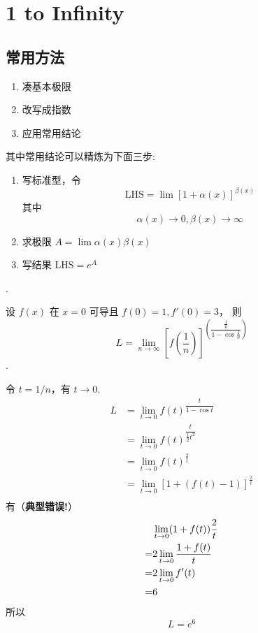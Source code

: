 \section{1 to Infinity}
\subsection{常用方法}
\begin{enumerate}
	\item 凑基本极限
	\item 改写成指数
	\item 应用常用结论
\end{enumerate}

其中常用结论可以精炼为下面三步:
\begin{enumerate}
	\item 写标准型，令
	\[\mbox{LHS} = \lim{} \left[ 1+\alpha(x)\right] ^{\beta(x)}\]
	其中 \[\alpha(x)\to0, \beta(x)\to\infty\]
	\item 求极限 $A = \lim \alpha(x)\beta(x)$
	\item 写结果 $\mbox{LHS} = e^{A}$
\end{enumerate}

\cite[question 30]{w660}.

\begin{example}
    \label{counter-example-of-usage-of-L-Hospital}
    设 $f(x)$ 在 $x = 0$ 可导且 $f(0) = 1, f'(0) = 3$，
    则
    \[
        L = \lim_{n \to \infty} {\left[
            f \left(\dfrac{1}{n}\right) 
        \right]}^{\left(\dfrac{\frac{1}{n}}{1 - \cos \frac{1}{n}} \right)}
    \]
    \cite[question 30]{w660}.

    令 $t = 1/n$，有 $t \to 0$.
    \begin{align*}
        L &= \lim_{t \to 0} {f(t)}^{\dfrac{t}{1 - \cos t}} \\
          &= \lim_{t \to 0} {f(t)}^{\dfrac{t}{\frac{1}{2} t^2}} \\
          &= \lim_{t \to 0} {f(t)}^{\frac{2}{t}} \\
          &= \lim_{t \to 0} {[1 + (f(t) - 1)]}^{\frac{2}{t}} \\
    \end{align*}
    有（\textbf{典型错误!}）
    \begin{align}
        &\lim_{t \to 0} (1+f(t)) \frac{2}{t} \notag \\
        = &2\lim_{t \to 0} \dfrac{1+ f(t)}{t} \notag \\
        = &2\lim_{t \to 0} {f'(t)} \label{eq:example-L-Hospital-illegal-usage}  \\
        = &6 \notag
    \end{align}
    所以
    \[
        L = e^{6}
    \]
\end{example}

